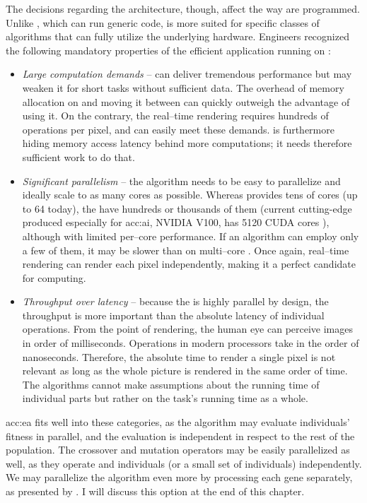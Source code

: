 The decisions regarding the architecture, though, affect the way  are programmed. Unlike \cpu, which can run generic code, \gpu is more suited for specific classes of algorithms that can fully utilize the underlying hardware. Engineers recognized the following mandatory properties of the efficient application running on \gpu \citep{GPUComputingOwens}:
\begin{itemize}
    \item \textit{Large computation demands} -- \gpu can deliver tremendous performance but may weaken it for short tasks without sufficient data. The overhead of memory allocation on \gpu and moving it between can quickly outweigh the advantage of using it. On the contrary, the real--time rendering requires hundreds of operations per pixel, and \gpu can easily meet these demands. \gpu is furthermore hiding memory access latency behind more computations; it needs therefore sufficient work to do that.
    \item \textit{Significant parallelism} -- the algorithm needs to be easy to parallelize and ideally scale to as many cores as possible. Whereas \cpu provides tens of cores (up to 64 today), the \gpu have hundreds or thousands of them (current cutting-edge \gpu produced especially for \acrshort{acc:ai}, NVIDIA V100, has 5120 CUDA cores \citep{nvidiav100spec}), although with limited per--core performance. If an algorithm can employ only a few of them, it may be slower than on multi--core \cpu. Once again, real--time rendering can render each pixel independently, making it a perfect candidate for \gpu computing.
    \item \textit{Throughput over latency} -- because the \gpu is highly parallel by design, the throughput is more important than the absolute latency of individual operations. From the point of rendering, the human eye can perceive images in order of milliseconds. Operations in modern processors take in the order of nanoseconds. Therefore, the absolute time to render a single pixel is not relevant as long as the whole picture is rendered in the same order of time. The algorithms cannot make assumptions about the running time of individual parts but rather on the task's running time as a whole.
\end{itemize}

\acrlong{acc:ea} fits well into these categories, as the algorithm may evaluate individuals' fitness in parallel, and the evaluation is independent in respect to the rest of the population. The crossover and mutation operators may be easily parallelized as well, as they operate and individuals (or a small set of individuals) independently. We may parallelize the algorithm even more by processing each gene separately, as presented by \citet{CHENG2019514}. I will discuss this option at the end of this chapter.




